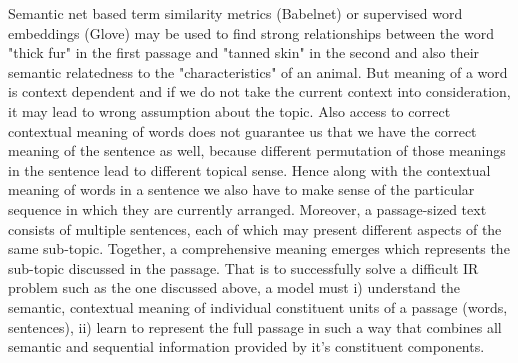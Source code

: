 \documentclass[sigconf,authordraft]{acmart}
\begin{document}


Semantic net based term similarity metrics (Babelnet) or supervised word embeddings (Glove) may be used to find strong relationships between the word "thick fur" in the first passage and "tanned skin" in the second and also their semantic relatedness to the "characteristics" of an animal. But meaning of a word is context dependent and if we do not take the current context into consideration, it may lead to wrong assumption about the topic. Also access to correct contextual meaning of words does not guarantee us that we have the correct meaning of the sentence as well, because different permutation of those meanings in the sentence lead to different topical sense. Hence along with the contextual meaning of words in a sentence we also have to make sense of the particular sequence in which they are currently arranged. Moreover, a passage-sized text consists of multiple sentences, each of which may present different aspects of the same sub-topic. Together, a comprehensive meaning emerges which represents the sub-topic discussed in the passage. That is to successfully solve a difficult IR problem such as the one discussed above, a model must i) understand the semantic, contextual meaning of individual constituent units of a passage (words, sentences), ii) learn to represent the full passage in such a way that combines all semantic and sequential information provided by it's constituent components.
\end{document}
